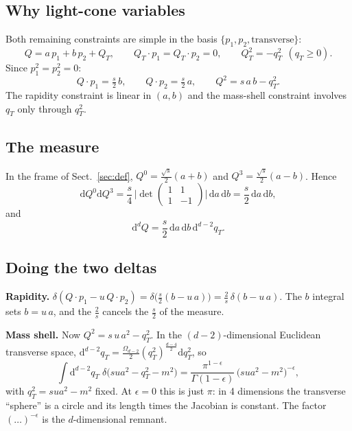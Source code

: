 \documentclass[11pt,a4paper]{article}
\newcommand{\ep}{\epsilon}
\newcommand{\dd}{\mathrm{d}}
\begin{document}
\subsection{Why light-cone variables}
Both remaining constraints are simple in the basis $\{p_1,p_2,\text{transverse}\}$:
\begin{equation}
  Q=a\,p_1+b\,p_2+Q_T,\qquad Q_T\cdot p_1=Q_T\cdot p_2=0,\qquad Q_T^2=-q_T^2\ \ (q_T\ge0).
\end{equation}
Since $p_1^2=p_2^2=0$:
\[
  Q\cdot p_1=\tfrac s2\,b,\qquad Q\cdot p_2=\tfrac s2\,a,\qquad Q^2=s\,a\,b-q_T^2 .
\]
The rapidity constraint is linear in $(a,b)$ and the mass-shell constraint involves $q_T$ only through $q_T^2$.

\subsection{The measure}
In the frame of Sect.~\ref{sec:def}, $Q^0=\frac{\sqrt s}2(a+b)$ and $Q^3=\frac{\sqrt s}2(a-b)$. Hence
\[\dd Q^0\dd Q^3=\frac s4\,\Big|\det\begin{pmatrix}1&1\\1&-1\end{pmatrix}\Big|\,\dd a\,\dd b=\frac s2\,\dd a\,\dd b,\]
and
\begin{equation}
  \dd^dQ=\frac s2\,\dd a\,\dd b\,\dd^{d-2}q_T .
\end{equation}

\subsection{Doing the two deltas}
\textbf{Rapidity.} $\delta(Q\cdot p_1-u\,Q\cdot p_2)=\delta\big(\frac s2(b-u\,a)\big)=\frac2s\,\delta(b-u\,a)$.
The $b$ integral sets $b=u\,a$, and the $\frac2s$ cancels the $\frac s2$ of the measure.

\textbf{Mass shell.} Now $Q^2=s\,u\,a^2-q_T^2$. In the $(d-2)$-dimensional Euclidean transverse space,
$\dd^{d-2}q_T=\frac{\Omega_{d-2}}2(q_T^2)^{\frac{d-4}2}\dd q_T^2$, so
\begin{equation}
  \int\dd^{d-2}q_T\;\delta\big(s u a^2-q_T^2-m^2\big)=\frac{\pi^{1-\ep}}{\Gamma(1-\ep)}\,\big(s u a^2-m^2\big)^{-\ep},
  \label{eq:qt}
\end{equation}
with $q_T^2=s u a^2-m^2$ fixed. At $\ep=0$ this is just $\pi$: in 4 dimensions the transverse ``sphere'' is a circle
and its length times the Jacobian is constant. The factor $(\dots)^{-\ep}$ is the $d$-dimensional remnant.
\end{document}
